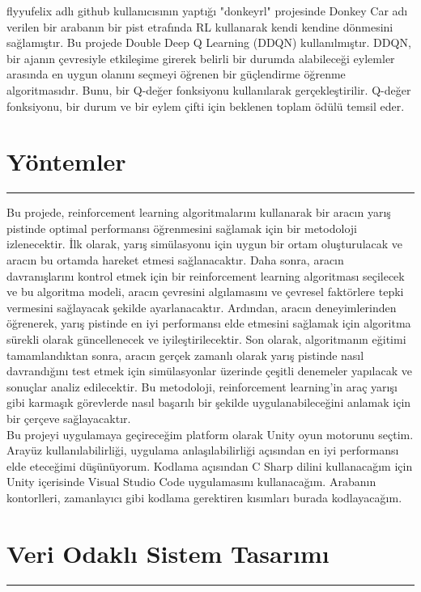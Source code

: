 \documentclass{article}
\begin{document}
\newpage
\newline
\noindent
flyyufelix adlı github kullanıcısının yaptığı "donkeyrl" projesinde Donkey Car adı verilen bir arabanın bir pist etrafında RL kullanarak kendi kendine dönmesini sağlamıştır. Bu projede Double Deep Q Learning (DDQN) kullanılmıştır. DDQN, bir ajanın çevresiyle etkileşime girerek belirli bir durumda alabileceği eylemler arasında en uygun olanını seçmeyi öğrenen bir güçlendirme öğrenme algoritmasıdır. Bunu, bir Q-değer fonksiyonu kullanılarak gerçekleştirilir. Q-değer fonksiyonu, bir durum ve bir eylem çifti için beklenen toplam ödülü temsil eder.\\[15pt]

\section{Yöntemler}
\rule{\textwidth}{0.5pt}
Bu projede, reinforcement learning algoritmalarını kullanarak bir aracın yarış pistinde optimal performansı öğrenmesini sağlamak için bir metodoloji izlenecektir. İlk olarak, yarış simülasyonu için uygun bir ortam oluşturulacak ve aracın bu ortamda hareket etmesi sağlanacaktır. Daha sonra, aracın davranışlarını kontrol etmek için bir reinforcement learning algoritması seçilecek ve bu algoritma modeli, aracın çevresini algılamasını ve çevresel faktörlere tepki vermesini sağlayacak şekilde ayarlanacaktır. Ardından, aracın deneyimlerinden öğrenerek, yarış pistinde en iyi performansı elde etmesini sağlamak için algoritma sürekli olarak güncellenecek ve iyileştirilecektir. Son olarak, algoritmanın eğitimi tamamlandıktan sonra, aracın gerçek zamanlı olarak yarış pistinde nasıl davrandığını test etmek için simülasyonlar üzerinde çeşitli denemeler yapılacak ve sonuçlar analiz edilecektir. Bu metodoloji, reinforcement learning'in araç yarışı gibi karmaşık görevlerde nasıl başarılı bir şekilde uygulanabileceğini anlamak için bir çerçeve sağlayacaktır.\\[5pt]
\newline
Bu projeyi uygulamaya geçireceğim platform olarak Unity oyun motorunu seçtim. Arayüz kullanılabilirliği, uygulama anlaşılabilirliği açısından en iyi performansı elde eteceğimi düşünüyorum. Kodlama açısından C Sharp dilini kullanacağım için Unity içerisinde Visual Studio Code uygulamasını kullanacağım. Arabanın kontorlleri, zamanlayıcı gibi kodlama gerektiren kısımları burada kodlayacağım.\\[15pt]

\newpage

\section{Veri Odaklı Sistem Tasarımı}
\rule{\textwidth}{0.5pt}
\end{document}
